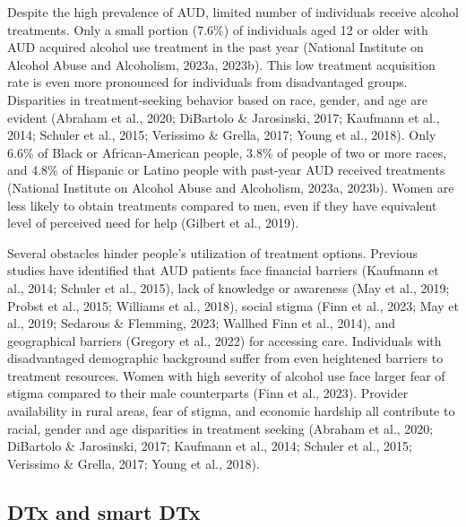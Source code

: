 \documentclass[
  letterpaper,
  DIV=11,
  numbers=noendperiod]{scrartcl}
\begin{document}
Despite the high prevalence of AUD, limited number of individuals
receive alcohol treatments. Only a small portion (7.6\%) of individuals
aged 12 or older with AUD acquired alcohol use treatment in the past
year (National Institute on Alcohol Abuse and Alcoholism, 2023a, 2023b).
This low treatment acquisition rate is even more pronounced for
individuals from disadvantaged groups. Disparities in treatment-seeking
behavior based on race, gender, and age are evident (Abraham et al.,
2020; DiBartolo \& Jarosinski, 2017; Kaufmann et al., 2014; Schuler et
al., 2015; Verissimo \& Grella, 2017; Young et al., 2018). Only 6.6\% of
Black or African-American people, 3.8\% of people of two or more races,
and 4.8\% of Hispanic or Latino people with past-year AUD received
treatments (National Institute on Alcohol Abuse and Alcoholism, 2023a,
2023b). Women are less likely to obtain treatments compared to men, even
if they have equivalent level of perceived need for help (Gilbert et
al., 2019).

Several obstacles hinder people's utilization of treatment options.
Previous studies have identified that AUD patients face financial
barriers (Kaufmann et al., 2014; Schuler et al., 2015), lack of
knowledge or awareness (May et al., 2019; Probst et al., 2015; Williams
et al., 2018), social stigma (Finn et al., 2023; May et al., 2019;
Sedarous \& Flemming, 2023; Wallhed Finn et al., 2014), and geographical
barriers (Gregory et al., 2022) for accessing care. Individuals with
disadvantaged demographic background suffer from even heightened
barriers to treatment resources. Women with high severity of alcohol use
face larger fear of stigma compared to their male counterparts (Finn et
al., 2023). Provider availability in rural areas, fear of stigma, and
economic hardship all contribute to racial, gender and age disparities
in treatment seeking (Abraham et al., 2020; DiBartolo \& Jarosinski,
2017; Kaufmann et al., 2014; Schuler et al., 2015; Verissimo \& Grella,
2017; Young et al., 2018).

\subsection{DTx and smart DTx}\label{dtx-and-smart-dtx}
\end{document}
